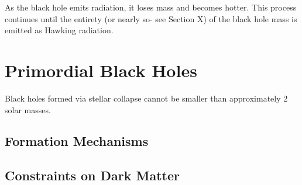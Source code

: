 As the black hole emits radiation, it loses mass and becomes hotter.
This process continues until the entirety (or nearly so- see Section X) of the black hole mass is emitted as Hawking radiation.

\section{Primordial Black Holes}
Black holes formed via stellar collapse cannot be smaller than approximately 2 solar masses.
\subsection{Formation Mechanisms}
\subsection{Constraints on Dark Matter}
